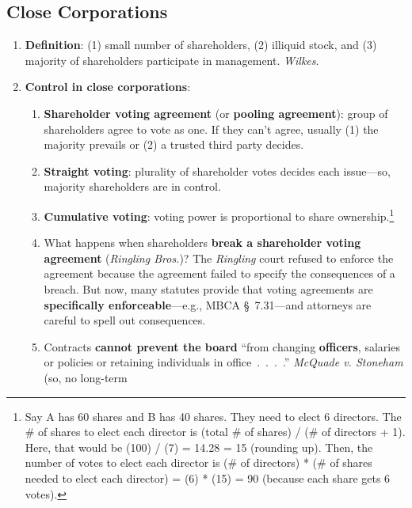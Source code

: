 


\newpage

\subsection{Close Corporations}

\begin{enumerate}
    \item \textbf{Definition}: (1) small number of shareholders, (2) illiquid 
    stock, and (3) majority of shareholders participate in management. 
    \emph{Wilkes}.
    \item \textbf{Control in close corporations}:
    \begin{enumerate}
        \item \textbf{Shareholder voting agreement} (or \textbf{pooling 
        agreement}): group of shareholders agree to vote as one. If they can't 
        agree, usually (1) the majority prevails or (2) a trusted third party 
        decides.
        \item \textbf{Straight voting}: plurality of shareholder votes 
        decides each issue---so, majority shareholders are in control.
        \item \textbf{Cumulative voting}: voting power is proportional to 
        share ownership.\footnote{Say A has 60 shares and B has 40 shares. 
        They need to elect 6 directors. The \# of shares to elect each 
        director is (total \# of shares) / (\# of directors + 1). Here, that 
        would be (100) / (7) = 14.28 = 15 (rounding up).
        Then, the number of votes to elect each director is (\# of directors) 
        * (\# of shares needed to elect each director) = (6) * (15) = 90 
        (because each share gets 6 votes).}
        \item What happens when shareholders \textbf{break a shareholder 
        voting agreement} (\emph{Ringling Bros.})? The \emph{Ringling} court 
        refused to enforce the agreement because the agreement failed to 
        specify the consequences of a breach. But now, many statutes provide 
        that voting agreements are \textbf{specifically enforceable}---e.g., 
        MBCA \S\ 7.31---and attorneys are careful to spell out consequences.
        \item Contracts \textbf{cannot prevent the board} ``from changing 
        \textbf{officers}, salaries or policies or retaining individuals in 
        office~.~.~.~.'' \emph{McQuade v. Stoneham} (so, no long-term 

\end{enumerate}
\end{enumerate}

